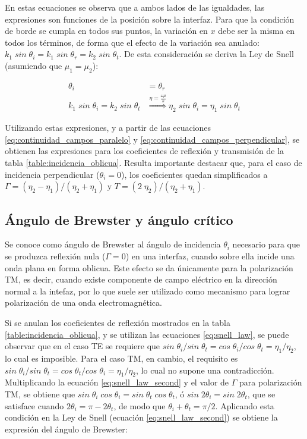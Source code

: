 En estas ecuaciones se observa que a ambos lados de las igualdades, las expresiones son funciones de la posición sobre la interfaz. Para que la condición de borde se cumpla en todos sus puntos, la variación en $x$ debe ser la misma en todos los términos, de forma que el efecto de la variación sea anulado: $k_1 \; sin\; \theta_i = k_1 \; sin \; \theta_r = k_2 \; sin\; \theta_t$.  De esta consideración se deriva la Ley de Snell (asumiendo que $\mu_1 = \mu_2$):

\begin{subequations}
	\label{eq:snell_law}
	\begin{align}
	\theta_i &= \theta_r \\
	k_1 \; sin\; \theta_i = k_2 \; sin\; \theta_t & \overset{\eta=\frac{\omega\mu}{k}}{\Longrightarrow} \eta_2 \; sin\; \theta_i = \eta_1 \; sin\; \theta_t \label{eq:snell_law_second}
	\end{align}
\end{subequations}

Utilizando estas expresiones, y a partir de las ecuaciones \ref{eq:continuidad_campos_paralelo} y \ref{eq:continuidad_campos_perpendicular}, se obtienen las expresiones para los coeficientes de reflexión y transmisión de la tabla \ref{table:incidencia_oblicua}. Resulta importante destacar que, para el caso de incidencia perpendicular ($\theta_i = 0$), los coeficientes quedan simplificados a $\Gamma = (\eta_2 - \eta_1)/(\eta_2 + \eta_1)$ y $T = (2 \; \eta_2)/(\eta_2 + \eta_1)$.

\subsection{Ángulo de Brewster y ángulo crítico}

Se conoce como ángulo de Brewster al ángulo de incidencia $\theta_i$ necesario para que se produzca reflexión nula ($\Gamma = 0$) en una interfaz, cuando sobre ella incide una onda plana en forma oblicua. Este efecto se da únicamente para la polarización TM, es decir, cuando existe componente de campo eléctrico en la dirección normal a la intefaz, por lo que suele ser utilizado como mecanismo para lograr polarización de una onda electromagnética.

Si se anulan los coeficientes de reflexión mostrados en la tabla \ref{table:incidencia_oblicua}, y se utilizan las ecuaciones \ref{eq:snell_law}, se puede observar que en el caso TE se requiere que $sin \; \theta_i / sin \; \theta_t = cos \; \theta_i / cos \; \theta_t = \eta_1 / \eta_2$, lo cual es imposible. Para el caso TM, en cambio, el requisito es $sin \; \theta_i / sin \; \theta_t = cos \; \theta_t / cos \; \theta_i = \eta_1 / \eta_2$, lo cual no supone una contradicción. Multiplicando la ecuación \ref{eq:snell_law_second} y el valor de $\Gamma$ para polarización TM, se obtiene que $sin\;\theta_i \; cos \; \theta_i = sin \; \theta_t \; cos \; \theta_t$, ó $sin \; 2\theta_i = sin \; 2\theta_t$, que se satisface cuando $2\theta_i = \pi - 2\theta_t$, de modo que $\theta_i + \theta_t = \pi/2$. Aplicando esta condición en la Ley de Snell (ecuación \ref{eq:snell_law_second}) se obtiene la expresión del ángulo de Brewster:


